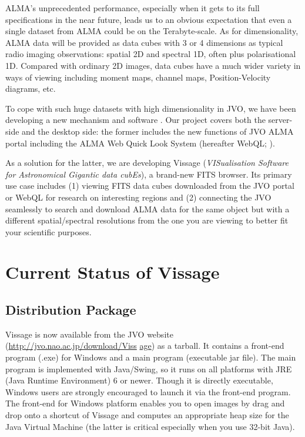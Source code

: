 ALMA's unprecedented performance, especially when it gets to its full specifications in the near future, leads us to an obvious expectation that even a single dataset from ALMA could be on the Terabyte-scale. As for dimensionality, ALMA data will be provided as data cubes with 3 or 4 dimensions as typical radio imaging observations: spatial 2D and spectral  1D, often plus polarisational 1D. Compared with ordinary 2D images, data cubes have a much wider variety in ways of viewing including moment maps, channel maps, Position-Velocity diagrams, etc. 

To cope with such huge datasets with high dimensionality in JVO, we have been developing a new mechanism and software \citep{O10_adassxxii, D5_adassxxii}. Our project covers both the server-side and the desktop side: the former includes the new functions of JVO ALMA portal including the ALMA Web Quick Look System (hereafter WebQL; \citet{O10_adassxxii}). 

As a solution for the latter, we are developing Vissage ({\it VISualisation Software for Astronomical Gigantic data cubEs}), a brand-new FITS browser. Its primary use case includes (1) viewing FITS data cubes downloaded from the JVO portal or WebQL for research on interesting regions and (2) connecting the JVO seamlessly to search and download ALMA data for the same object but with a different spatial/spectral resolutions from the one you are viewing to better fit your scientific purposes. 

\section{Current Status of Vissage}
\subsection{Distribution Package}
Vissage is now available from the JVO website (\url{http://jvo.nao.ac.jp/download/Viss} \url{age}) as a tarball. It contains a front-end program (.exe) for Windows and a main program (executable jar file). The main program is implemented with Java/Swing, so it runs on all platforms with JRE (Java Runtime Environment) 6 or newer. Though it is directly executable, Windows users are strongly encouraged to launch it via the front-end program. The front-end for Windows platform enables you to open images by drag and drop onto a shortcut of Vissage and computes an appropriate heap size for the Java Virtual Machine (the latter is critical especially when you use 32-bit Java). 


